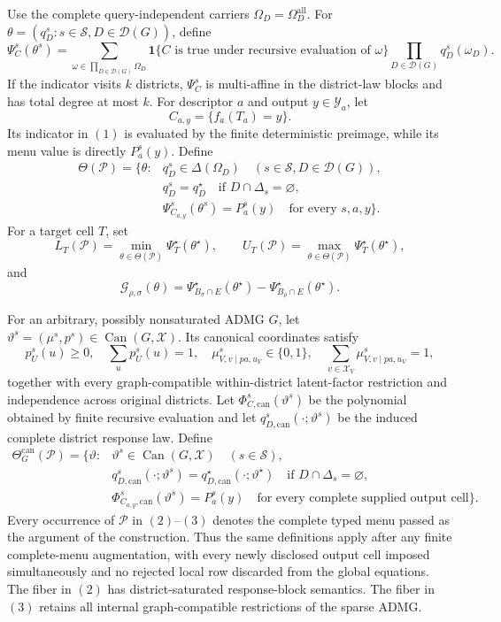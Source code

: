 Use the complete query-independent carriers \(\Omega_D=\Omega_D^{\mathrm{all}}\).  For \(\theta=(q_D^s:s\in\mathcal S,D\in\mathcal D(G))\), define
\[
\Psi_C^s(\theta^s)=
\sum_{\omega\in\prod_{D\in\mathcal D(G)}\Omega_D}
\mathbf 1\{C\text{ is true under recursive evaluation of }\omega\}
\prod_{D\in\mathcal D(G)}q_D^s(\omega_D).
\tag{1}
\]
If the indicator visits \(k\) districts, \(\Psi_C^s\) is multi-affine in the district-law blocks and has total degree at most \(k\).  For descriptor \(a\) and output \(y\in\mathcal Y_a\), let
\[
C_{a,y}=\{f_a(T_a)=y\}.
\]
Its indicator in \((1)\) is evaluated by the finite deterministic preimage, while its menu value is directly \(P_a^s(y)\).  Define
\[
\begin{split}
\Theta(\mathcal P)=\bigl\{\theta:{}&
q_D^s\in\Delta(\Omega_D)
\quad(s\in\mathcal S,D\in\mathcal D(G)),\\
&q_D^s=q_D^\star
\quad\text{if }D\cap\Delta_s=\varnothing,\\
&\Psi_{C_{a,y}}^s(\theta^s)=P_a^s(y)
\quad\text{for every }s,a,y\bigr\}.
\end{split}
\tag{2}
\]
For a target cell \(T\), set
\[
L_T(\mathcal P)=\min_{\theta\in\Theta(\mathcal P)}
\Psi_T^\star(\theta^\star),
\qquad
U_T(\mathcal P)=\max_{\theta\in\Theta(\mathcal P)}
\Psi_T^\star(\theta^\star),
\]
and
\[
\mathcal G_{\rho,\sigma}(\theta)=
\Psi_{B_\sigma\cap E}^\star(\theta^\star)
-\Psi_{B_\rho\cap E}^\star(\theta^\star).
\]

For an arbitrary, possibly nonsaturated ADMG \(G\), let \(\vartheta^s=(\mu^s,p^s)\in\operatorname{Can}(G,\mathcal X)\).  Its canonical coordinates satisfy
\[
p_U^s(u)\geq0,\quad\sum_up_U^s(u)=1,
\quad \mu_{V,v\mid pa,u_V}^s\in\{0,1\},
\quad \sum_{v\in\mathcal X_V}\mu_{V,v\mid pa,u_V}^s=1,
\]
together with every graph-compatible within-district latent-factor restriction and independence across original districts.  Let \(\Phi_{C,\mathrm{can}}^s(\vartheta^s)\) be the polynomial obtained by finite recursive evaluation and let \(q_{D,\mathrm{can}}^s(\cdot;\vartheta^s)\) be the induced complete district response law.  Define
\[
\begin{split}
\Theta_G^{\mathrm{can}}(\mathcal P)=\bigl\{\vartheta:{}&
\vartheta^s\in\operatorname{Can}(G,\mathcal X)
\quad(s\in\mathcal S),\\
&q_{D,\mathrm{can}}^s(\cdot;\vartheta^s)
=q_{D,\mathrm{can}}^\star(\cdot;\vartheta^\star)
\quad\text{if }D\cap\Delta_s=\varnothing,\\
&\Phi_{C_{a,y},\mathrm{can}}^s(\vartheta^s)=P_a^s(y)
\quad\text{for every complete supplied output cell}\bigr\}.
\end{split}
\tag{3}
\]
Every occurrence of \(\mathcal P\) in \((2)\)--\((3)\) denotes the complete typed menu passed as the argument of the construction.  Thus the same definitions apply after any finite complete-menu augmentation, with every newly disclosed output cell imposed simultaneously and no rejected local row discarded from the global equations.  The fiber in \((2)\) has district-saturated response-block semantics.  The fiber in \((3)\) retains all internal graph-compatible restrictions of the sparse ADMG.
